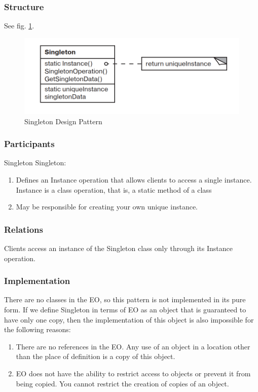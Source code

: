 \documentclass[sigplan,12pt,nonacm=true,review=false]{acmart}
\begin{document}
\subsubsection{Structure}
See fig. \ref{fig:singleton}.
\begin{figure}
    \centering
    \includegraphics{eolang/tr-02/assets/Picture6.png}
    \caption{Singleton Design Pattern}
    \label{fig:singleton}
\end{figure}

\subsubsection{Participants}
Singleton Singleton:
\begin{enumerate}
    \item Defines an Instance operation that allows clients to access a single instance. Instance is a class operation,  that is,  a static method of a class
    \item May be responsible for creating your own unique instance.
\end{enumerate}

\subsubsection{Relations}
Clients access an instance of the Singleton class only through its Instance operation. 

\subsubsection{Implementation}
There are no classes in the EO, so this pattern is not implemented in its pure form. If we define Singleton in  terms  of  EO as an object that is guaranteed to have only one copy, then the implementation of this object is also impossible for the following reasons:
\begin{enumerate}
    \item There are no references in the EO.  Any use of an object in a location other than the place of definition is a copy of this object.
    \item EO  does not have the ability to restrict access to objects or prevent it from being copied. You cannot restrict the creation of copies of an object.

\end{enumerate}
\end{document}
